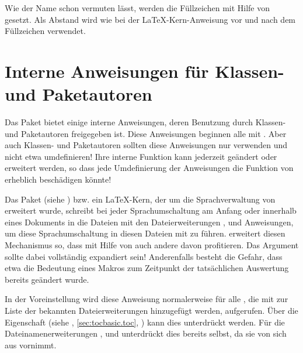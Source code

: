 Wie der Name schon vermuten lässt, werden die Füllzeichen mit Hilfe von
 gesetzt. Als Abstand wird wie bei der \LaTeX-Kern-Anweisung
 vor und nach dem Füllzeichen
 verwendet.%
\EndIndexGroup
%
\EndIndexGroup


\section{Interne Anweisungen für Klassen- und Paketautoren}

Das Paket  bietet einige interne Anweisungen, deren
Benutzung durch Klassen- und Paketautoren freigegeben ist. Diese Anweisungen
beginnen alle mit . Aber auch Klassen- und
Paketautoren sollten diese Anweisungen nur verwenden und nicht etwa
umdefinieren! Ihre interne Funktion kann jederzeit geändert oder erweitert
werden, so dass jede Umdefinierung der Anweisungen die Funktion von
 erheblich beschädigen könnte!


\begin{Declaration}
\end{Declaration}
Das Paket  (siehe \cite{package:babel})
bzw. ein \LaTeX-Kern, der um die Sprachverwaltung von 
erweitert wurde, schreibt bei jeder Sprachumschaltung am Anfang oder innerhalb
eines Dokuments in die Dateien mit den Dateierweiterungen ,
 und  Anweisungen, um diese Sprachumschaltung in diesen
Dateien mit zu führen.  erweitert diesen Mechanismus so,
dass mit Hilfe von  auch andere
 davon profitieren. Das Argument
 sollte dabei vollständig expandiert sein!
Anderenfalls besteht die Gefahr, dass etwa die Bedeutung eines Makros zum
Zeitpunkt der tatsächlichen Auswertung bereits geändert wurde.

In der Voreinstellung wird diese Anweisung normalerweise für alle
, die mit  zur
Liste der bekannten Dateierweiterungen hinzugefügt werden, aufgerufen. Über
die Eigenschaft  (siehe
, \autoref{sec:tocbasic.toc},
) kann dies unterdrückt werden. Für die
Dateinamenerweiterungen ,  und  unterdrückt
 dies bereits selbst, %
\iftrue%
da  sie von sich aus vornimmt.%
\else%
damit die Umschaltung nicht mehrfach in die zugehörigen Dateien
eingetragen wird.%
\fi

